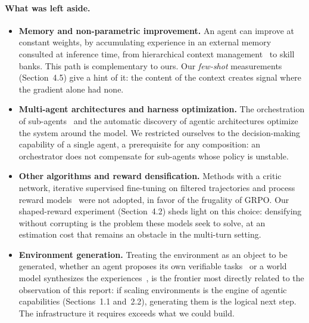 \documentclass[11pt,a4paper]{article}
\begin{document}
\paragraph{What was left aside.}
\begin{itemize}
    \item \textbf{Memory and non-parametric improvement.} An agent can improve at constant weights, by accumulating experience in an external memory consulted at inference time, from hierarchical context management~\cite{packer_memgpt_2023} to skill banks. This path is complementary to ours. Our \emph{few-shot} measurements (Section~4.5) give a hint of it: the content of the context creates signal where the gradient alone had none.
    \item \textbf{Multi-agent architectures and harness optimization.} The orchestration of sub-agents~\cite{kimi_k25_2026} and the automatic discovery of agentic architectures optimize the system around the model. We restricted ourselves to the decision-making capability of a single agent, a prerequisite for any composition: an orchestrator does not compensate for sub-agents whose policy is unstable.
    \item \textbf{Other algorithms and reward densification.} Methods with a critic network, iterative supervised fine-tuning on filtered trajectories and process reward models~\cite{lightman2023verify} were not adopted, in favor of the frugality of GRPO. Our shaped-reward experiment (Section~4.2) sheds light on this choice: densifying without corrupting is the problem these models seek to solve, at an estimation cost that remains an obstacle in the multi-turn setting.
    \item \textbf{Environment generation.} Treating the environment as an object to be generated, whether an agent proposes its own verifiable tasks~\cite{zhou2025sca} or a world model synthesizes the experiences~\cite{dreamgym2025}, is the frontier most directly related to the observation of this report: if scaling environments is the engine of agentic capabilities (Sections~1.1 and~2.2), generating them is the logical next step. The infrastructure it requires exceeds what we could build.
\end{itemize}
\end{document}
